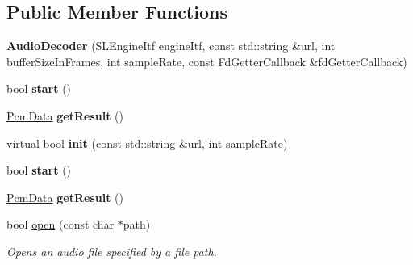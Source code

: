 \subsection*{Public Member Functions}
\begin{DoxyCompactItemize}
\item 
\mbox{\label{classcocos2d_1_1experimental_1_1AudioDecoder_ac7aa722795b2f12b73c9f6233928950d}} 
{\bfseries Audio\+Decoder} (S\+L\+Engine\+Itf engine\+Itf, const std\+::string \&url, int buffer\+Size\+In\+Frames, int sample\+Rate, const Fd\+Getter\+Callback \&fd\+Getter\+Callback)
\item 
\mbox{\label{classcocos2d_1_1experimental_1_1AudioDecoder_a8d0250b323e9a1c128eb91b81fdd6a06}} 
bool {\bfseries start} ()
\item 
\mbox{\label{classcocos2d_1_1experimental_1_1AudioDecoder_a4d26cd91658bcad5a0a934551ebebf9d}} 
\hyperlink{structcocos2d_1_1experimental_1_1PcmData}{Pcm\+Data} {\bfseries get\+Result} ()
\item 
\mbox{\label{classcocos2d_1_1experimental_1_1AudioDecoder_a6842921bd3664de32c3aba919ad48ef4}} 
virtual bool {\bfseries init} (const std\+::string \&url, int sample\+Rate)
\item 
\mbox{\label{classcocos2d_1_1experimental_1_1AudioDecoder_a8d0250b323e9a1c128eb91b81fdd6a06}} 
bool {\bfseries start} ()
\item 
\mbox{\label{classcocos2d_1_1experimental_1_1AudioDecoder_a4d26cd91658bcad5a0a934551ebebf9d}} 
\hyperlink{structcocos2d_1_1experimental_1_1PcmData}{Pcm\+Data} {\bfseries get\+Result} ()
\item 
bool \hyperlink{classcocos2d_1_1experimental_1_1AudioDecoder_aab596e1f3d3f5ab2cf8de5ddb356db07}{open} (const char $\ast$path)
\begin{DoxyCompactList}\small\item\em Opens an audio file specified by a file path. \end{DoxyCompactList}\item 

\end{DoxyCompactItemize}
